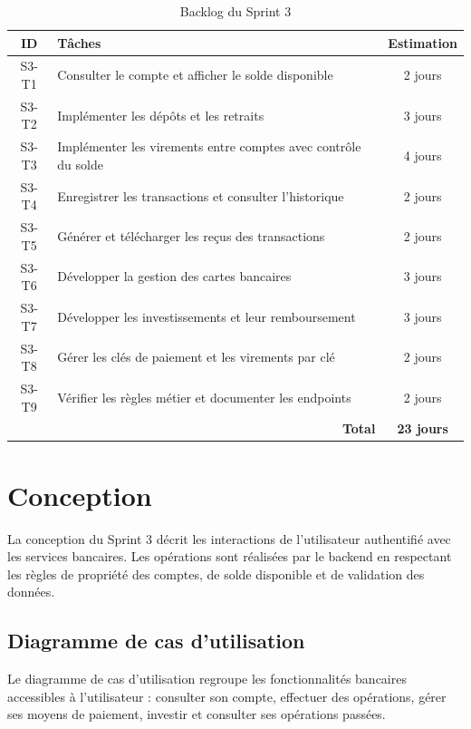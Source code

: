 \begin{table}[htbp]
\centering
\caption{Backlog du Sprint 3}
\label{tab:backlog_sprint3}
\renewcommand{\arraystretch}{1.3}
\begin{tabular}{|c|p{10cm}|c|}
\hline
\textbf{ID} & \textbf{Tâches} & \textbf{Estimation} \\
\hline
S3-T1 & Consulter le compte et afficher le solde disponible & 2 jours \\
\hline
S3-T2 & Implémenter les dépôts et les retraits & 3 jours \\
\hline
S3-T3 & Implémenter les virements entre comptes avec contrôle du solde & 4 jours \\
\hline
S3-T4 & Enregistrer les transactions et consulter l'historique & 2 jours \\
\hline
S3-T5 & Générer et télécharger les reçus des transactions & 2 jours \\
\hline
S3-T6 & Développer la gestion des cartes bancaires & 3 jours \\
\hline
S3-T7 & Développer les investissements et leur remboursement & 3 jours \\
\hline
S3-T8 & Gérer les clés de paiement et les virements par clé & 2 jours \\
\hline
S3-T9 & Vérifier les règles métier et documenter les endpoints & 2 jours \\
\hline
\multicolumn{2}{|r|}{\textbf{Total}} & \textbf{23 jours} \\
\hline
\end{tabular}
\end{table}

\section{Conception}
\label{sec:conception_sprint3}

La conception du Sprint 3 décrit les interactions de l'utilisateur
authentifié avec les services bancaires. Les opérations sont réalisées
par le backend en respectant les règles de propriété des comptes, de
solde disponible et de validation des données.

\subsection{Diagramme de cas d'utilisation}
\label{subsec:usecase_sprint3}

Le diagramme de cas d'utilisation regroupe les fonctionnalités
bancaires accessibles à l'utilisateur : consulter son compte, effectuer
des opérations, gérer ses moyens de paiement, investir et consulter
ses opérations passées.

